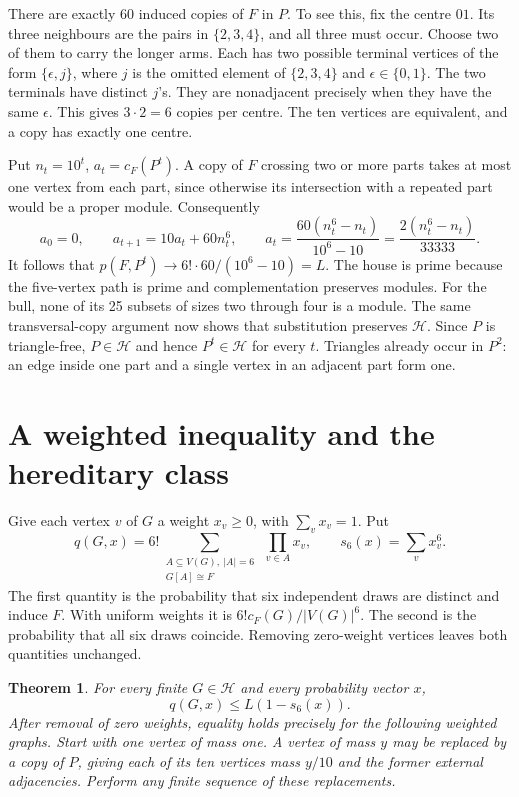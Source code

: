 \documentclass[11pt,a4paper]{article}
\newtheorem{theorem}{Theorem}
\newcommand{\BH}{\mathcal H}
\begin{document}
There are exactly 60 induced copies of \(F\) in \(P\). To see this, fix the centre \(01\). Its three neighbours are the pairs in \(\{2,3,4\}\), and all three must occur. Choose two of them to carry the longer arms. Each has two possible terminal vertices of the form \(\{\epsilon,j\}\), where \(j\) is the omitted element of \(\{2,3,4\}\) and \(\epsilon\in\{0,1\}\). The two terminals have distinct \(j\)'s. They are nonadjacent precisely when they have the same \(\epsilon\). This gives \(3\cdot2=6\) copies per centre. The ten vertices are equivalent, and a copy has exactly one centre.

Put \(n_t=10^t\), \(a_t=c_F(P^t)\). A copy of \(F\) crossing two or more parts takes at most one vertex from each part, since otherwise its intersection with a repeated part would be a proper module. Consequently
\[
 a_0=0,\qquad a_{t+1}=10a_t+60n_t^6,\qquad
 a_t=\frac{60(n_t^6-n_t)}{10^6-10}=\frac{2(n_t^6-n_t)}{33333}.
\]
It follows that \(p(F,P^t)\to 6!\cdot60/(10^6-10)=L\). The house is prime because the five-vertex path is prime and complementation preserves modules. For the bull, none of its 25 subsets of sizes two through four is a module. The same transversal-copy argument now shows that substitution preserves \(\BH\). Since \(P\) is triangle-free, \(P\in\BH\) and hence \(P^t\in\BH\) for every \(t\). Triangles already occur in \(P^2\): an edge inside one part and a single vertex in an adjacent part form one.

\section{A weighted inequality and the hereditary class}\label{sec:restricted}

Give each vertex \(v\) of \(G\) a weight \(x_v\ge0\), with \(\sum_v x_v=1\). Put
\begin{equation}\label{eq:defq}
 q(G,x)=6!\!\sum_{\substack{A\subseteq V(G),\ |A|=6\\G[A]\cong F}}\ \prod_{v\in A}x_v,
 \qquad s_6(x)=\sum_v x_v^6 .
\end{equation}
The first quantity is the probability that six independent draws are distinct and induce \(F\). With uniform weights it is \(6!c_F(G)/|V(G)|^6\). The second is the probability that all six draws coincide. Removing zero-weight vertices leaves both quantities unchanged.

\begin{theorem}\label{th:weighted}
For every finite \(G\in\BH\) and every probability vector \(x\),
\begin{equation}\label{eq:weighted}
 q(G,x)\le L(1-s_6(x)).
\end{equation}
After removal of zero weights, equality holds precisely for the following weighted graphs. Start with one vertex of mass one. A vertex of mass \(y\) may be replaced by a copy of \(P\), giving each of its ten vertices mass \(y/10\) and the former external adjacencies. Perform any finite sequence of these replacements.
\end{theorem}
\end{document}
